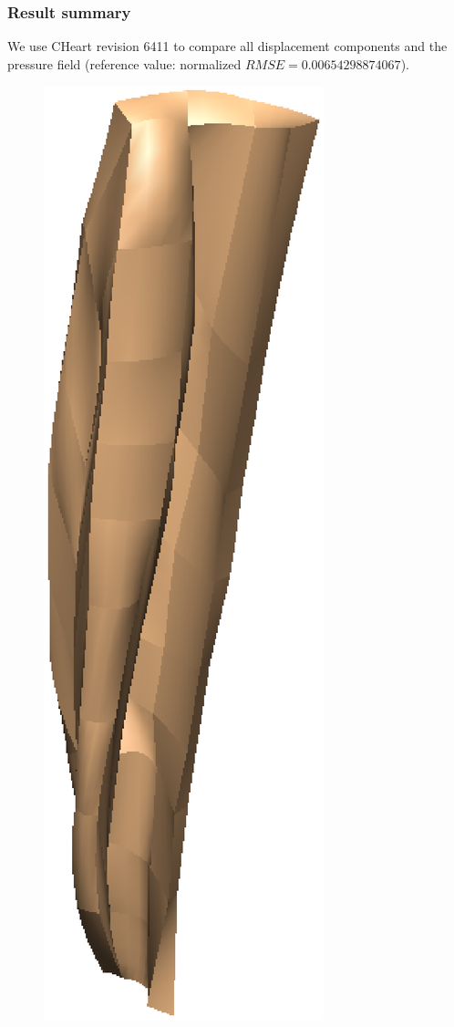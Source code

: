 \subsubsection{Result summary}
%
We use CHeart revision 6411 to compare all displacement components and the
pressure field (reference value: normalized $RMSE = 0.00654298874067$).
%


%
\begin{figure}[h!]
    \centering
    \includegraphics[width=0.49\columnwidth]{examples/example-0204-u/doc/figures/undeformed_geometry.eps}

\end{figure}
